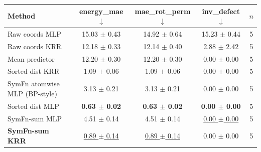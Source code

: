 \begin{tabular}{lcccc}
\toprule
Method & energy\_mae $\downarrow$ & mae\_rot\_perm $\downarrow$ & inv\_defect $\downarrow$ & $n$ \\
\midrule
Raw coords MLP & 15.03 $\pm$ 0.43 & 14.92 $\pm$ 0.64 & 15.23 $\pm$ 0.44 & 5 \\
Raw coords KRR & 12.18 $\pm$ 0.33 & 12.14 $\pm$ 0.40 & 2.88 $\pm$ 2.42 & 5 \\
Mean predictor & 12.20 $\pm$ 0.30 & 12.20 $\pm$ 0.30 & 0.00 $\pm$ 0.00 & 5 \\
Sorted dist KRR & 1.09 $\pm$ 0.06 & 1.09 $\pm$ 0.06 & 0.00 $\pm$ 0.00 & 5 \\
SymFn atomwise MLP (BP-style) & 3.13 $\pm$ 0.21 & 3.13 $\pm$ 0.21 & 0.00 $\pm$ 0.00 & 5 \\
Sorted dist MLP & \textbf{0.63 $\pm$ 0.02} & \textbf{0.63 $\pm$ 0.02} & \textbf{0.00 $\pm$ 0.00} & 5 \\
SymFn-sum MLP & 4.51 $\pm$ 0.14 & 4.51 $\pm$ 0.14 & \underline{0.00 $\pm$ 0.00} & 5 \\
\textbf{SymFn-sum KRR} & \underline{0.89 $\pm$ 0.14} & \underline{0.89 $\pm$ 0.14} & 0.00 $\pm$ 0.00 & 5 \\
\bottomrule
\end{tabular}
